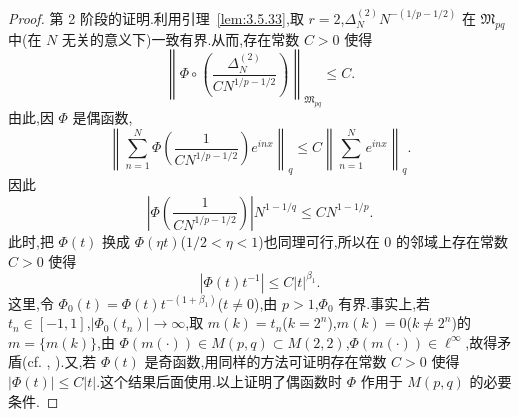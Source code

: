 \begin{proof}
第 2 阶段的证明.利用引理~\ref{lem:3.5.33},取 $r = 2$,$\Delta_N^{(2)}N^{-(1/p - 1/2)}$ 在 $\mathfrak{M}_{pq}$ 中(在 $N$ 无关的意义下)一致有界.从而,存在常数 $C > 0$ 使得
\begin{equation*}
\left\|\Phi \circ \left(\frac{\Delta_{N}^{(2)}}{C N^{1/p - 1/2}}\right)\right\|_{\mathfrak{M}_{pq}} \leq C.
\end{equation*}
由此,因 $\Phi$ 是偶函数,
\begin{equation*}
\left\|\sum_{n=1}^{N}\Phi\left(\frac{1}{C N^{1/p - 1/2}}\right)e^{inx}\right\|_{q} \leq C\left\|\sum_{n=1}^{N}e^{inx}\right\|_{q}.
\end{equation*}
因此
\begin{equation*}
\left|\Phi\left(\frac{1}{C N^{1/p - 1/2}}\right)\right|N^{1 - 1/q} \leq C N^{1 - 1/p}.
\end{equation*}
此时,把 $\Phi(t)$ 换成 $\Phi(\eta t)$($1/2 < \eta < 1$)也同理可行,所以在 0 的邻域上存在常数 $C > 0$ 使得
\begin{equation*}
|\Phi(t)t^{-1}| \leq C|t|^{\beta_{1}}.
\end{equation*}
这里,令 $\Phi_{0}(t)=\Phi(t)t^{-(1+\beta_{1})}$($t\neq0$),由 $p>1$,$\Phi_{0}$ 有界.事实上,若 $t_{n}\in[-1,1]$,$|\Phi_{0}(t_{n})|\to\infty$,取 $m(k)=t_{n}$($k=2^{n}$),$m(k)=0$($k\neq2^{n}$)的 $m=\{m(k)\}$,由 $\Phi(m(\cdot))\in M(p,q)\subset M(2,2)$,$\Phi(m(\cdot))\in\ell^{\infty}$,故得矛盾(cf. \cite{ch3:11}, \cite{ch3:26}).又,若 $\Phi(t)$ 是奇函数,用同样的方法可证明存在常数 $C>0$ 使得 $|\Phi(t)|\leq C|t|$.这个结果后面使用.以上证明了偶函数时 $\Phi$ 作用于 $M(p,q)$ 的必要条件.


\end{proof}
